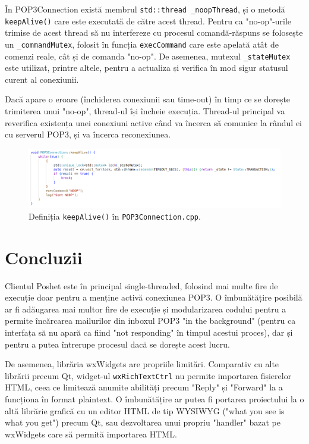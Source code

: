 \documentclass[runningheads]{llncs}
\begin{document}
În POP3Connection există membrul \texttt{std::thread \_noopThread}, și o metodă \texttt{keepAlive()} care este executată de către acest thread. Pentru ca "no-op"-urile trimise de acest thread să nu interfereze cu procesul comandă-răspuns se folosește un \texttt{\_commandMutex}, folosit în funcția \texttt{execCommand} care este apelată atât de comenzi reale, cât și de comanda "no-op". De asemenea, mutexul \texttt{\_stateMutex} este utilizat, printre altele, pentru a actualiza și verifica în mod sigur statusul curent al conexiunii.

Dacă apare o eroare (închiderea conexiunii sau time-out) în timp ce se dorește trimiterea unui "no-op", thread-ul își încheie execuția. Thread-ul principal va reverifica existența unei conexiuni active când va încerca să comunice la rândul ei cu serverul POP3, și va încerca reconexiunea.

\begin{figure}
    \centering
    \includegraphics[width=\textwidth]{keepAlive.png}
    \caption{Definiția \texttt{keepAlive()} în \texttt{POP3Connection.cpp}.}
    \label{fig:keepalive}
\end{figure}

\section{Concluzii}

Clientul Poshet este în principal single-threaded, folosind mai multe fire de execuție doar pentru a menține activă conexiunea POP3. O îmbunătățire posibilă ar fi adăugarea mai multor fire de execuție și modularizarea codului pentru a permite încărcarea mailurilor din inboxul POP3 "in the background" (pentru ca interfața să nu apară ca fiind "not responding" în timpul acestui proces), dar și pentru a putea întrerupe procesul dacă se dorește acest lucru.

De asemenea, librăria wxWidgets are propriile limitări. Comparativ cu alte librării precum Qt, widget-ul \texttt{wxRichTextCtrl} nu permite importarea fișierelor HTML, ceea ce limitează anumite abilități precum "Reply" și "Forward" la a funcționa în format plaintext. O îmbunătățire ar putea fi portarea proiectului la o altă librărie grafică cu un editor HTML de tip WYSIWYG ("what you see is what you get") precum Qt, sau dezvoltarea unui propriu "handler" bazat pe wxWidgets care să permită importarea HTML.
%
%
%
% 
% 
\end{document}
